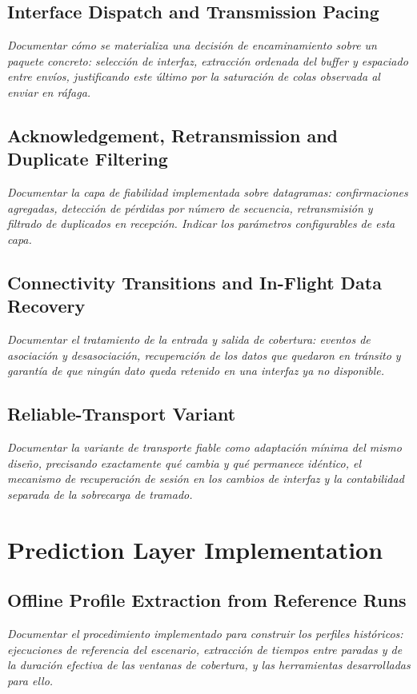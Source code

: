 \subsection{Interface Dispatch and Transmission Pacing}
\emph{Documentar cómo se materializa una decisión de encaminamiento sobre un
paquete concreto: selección de interfaz, extracción ordenada del buffer y
espaciado entre envíos, justificando este último por la saturación de colas
observada al enviar en ráfaga.}

\subsection{Acknowledgement, Retransmission and Duplicate Filtering}
\emph{Documentar la capa de fiabilidad implementada sobre datagramas:
confirmaciones agregadas, detección de pérdidas por número de secuencia,
retransmisión y filtrado de duplicados en recepción. Indicar los parámetros
configurables de esta capa.}

\subsection{Connectivity Transitions and In-Flight Data Recovery}
\emph{Documentar el tratamiento de la entrada y salida de cobertura: eventos de
asociación y desasociación, recuperación de los datos que quedaron en tránsito y
garantía de que ningún dato queda retenido en una interfaz ya no disponible.}

\subsection{Reliable-Transport Variant}
\emph{Documentar la variante de transporte fiable como adaptación mínima del
mismo diseño, precisando exactamente qué cambia y qué permanece idéntico, el
mecanismo de recuperación de sesión en los cambios de interfaz y la contabilidad
separada de la sobrecarga de tramado.}

\section{Prediction Layer Implementation}

\subsection{Offline Profile Extraction from Reference Runs}
\emph{Documentar el procedimiento implementado para construir los perfiles
históricos: ejecuciones de referencia del escenario, extracción de tiempos entre
paradas y de la duración efectiva de las ventanas de cobertura, y las
herramientas desarrolladas para ello.}

